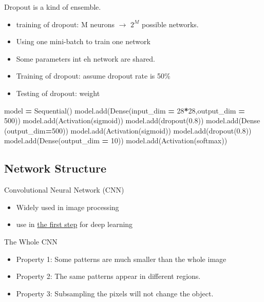 \documentclass[
]{book}
\newenvironment{Shaded}{\begin{snugshade}}{\end{snugshade}}
\newcommand{\DecValTok}[1]{\textcolor[rgb]{0.00,0.00,0.81}{#1}}
\newcommand{\FloatTok}[1]{\textcolor[rgb]{0.00,0.00,0.81}{#1}}
\newcommand{\NormalTok}[1]{#1}
\newcommand{\OperatorTok}[1]{\textcolor[rgb]{0.81,0.36,0.00}{\textbf{#1}}}
\newcommand{\StringTok}[1]{\textcolor[rgb]{0.31,0.60,0.02}{#1}}
\providecommand{\tightlist}{%
  \setlength{\itemsep}{0pt}\setlength{\parskip}{0pt}}
\begin{document}
Dropout is a kind of ensemble.

\begin{itemize}
\item
  training of dropout: M neurons \(\to\) \(2^M\) possible networks.
\item
  Using one mini-batch to train one network
\item
  Some parameters int eh network are shared.
\item
  Training of dropout: assume dropout rate is 50\%
\item
  Testing of dropout: weight
\end{itemize}

\begin{Shaded}
\begin{Highlighting}[]
\NormalTok{model }\OperatorTok{=}\NormalTok{ Sequential()}
\NormalTok{model.add(Dense(input\_dim }\OperatorTok{=} \DecValTok{28}\OperatorTok{*}\DecValTok{28}\NormalTok{,output\_dim }\OperatorTok{=} \DecValTok{500}\NormalTok{))}
\NormalTok{model.add(Activation(}\StringTok{\textquotesingle{}sigmoid\textquotesingle{}}\NormalTok{))}
\NormalTok{model.add(dropout(}\FloatTok{0.8}\NormalTok{))}
\NormalTok{model.add(Dense (output\_dim}\OperatorTok{=}\DecValTok{500}\NormalTok{))}
\NormalTok{model.add(Activation(}\StringTok{\textquotesingle{}sigmoid\textquotesingle{}}\NormalTok{))}
\NormalTok{model.add(dropout(}\FloatTok{0.8}\NormalTok{))}
\NormalTok{model.add(Dense(output\_dim }\OperatorTok{=} \DecValTok{10}\NormalTok{))}
\NormalTok{model.add(Activation(}\StringTok{\textquotesingle{}softmax\textquotesingle{}}\NormalTok{))}
\end{Highlighting}
\end{Shaded}

\hypertarget{network-structure}{%
\subsection{Network Structure}\label{network-structure}}

Convolutional Neural Network (CNN)

\begin{itemize}
\tightlist
\item
  Widely used in image processing
\item
  use in \protect\hyperlink{step-1-a-set-of-function}{the first step} for deep learning
\end{itemize}

The Whole CNN

\begin{itemize}
\tightlist
\item
  Property 1: Some patterns are much smaller than the whole image\\
\item
  Property 2: The same patterns appear in different regions.\\
\item
  Property 3: Subsampling the pixels will not change the object.
\end{itemize}
\end{document}
